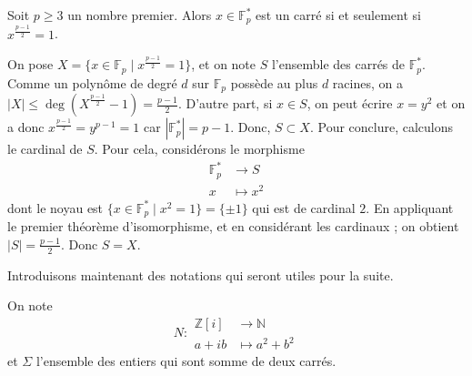 





	\begin{lemma}
		\label{theoreme-des-deux-carres-fermat-1}
		Soit $p \geq 3$ un nombre premier. Alors $x \in \mathbb{F}^*_p$ est un carré si et seulement si $x^{\frac{p-1}{2}} = 1$.
	\end{lemma}

	\begin{demonstration}
		On pose $X = \{ x \in \mathbb{F}_p \mid x^{\frac{p-1}{2}} = 1 \}$, et on note $S$ l'ensemble des carrés de $\mathbb{F}_p^*$. Comme un polynôme de degré $d$ sur $\mathbb{F}_p$ possède au plus $d$ racines, on a $|X| \leq \deg \left( X^{\frac{p-1}{2}} - 1 \right) = \frac{p-1}{2}$.
		\newpar
		D'autre part, si $x \in S$, on peut écrire $x = y^2$ et on a donc $x^{\frac{p-1}{2}} = y^{p-1} = 1$ car $|\mathbb{F}_p^*| = p-1$. Donc, $S \subset X$.
		\newpar
		Pour conclure, calculons le cardinal de $S$. Pour cela, considérons le morphisme
		\[
		\begin{array}{cl}
			\mathbb{F}_p^* &\rightarrow S \\
			x &\mapsto x^2
		\end{array}
		\]
		dont le noyau est $\{ x \in \mathbb{F}_p^* \mid x^2 = 1 \} = \{ \pm 1 \}$ qui est de cardinal $2$. En appliquant le premier théorème d'isomorphisme, et en considérant les cardinaux ; on obtient $|S| = \frac{p-1}{2}$. Donc $S = X$.
	\end{demonstration}

	Introduisons maintenant des notations qui seront utiles pour la suite.

	\begin{notation}
		On note \[ N :
		\begin{array}{cl}
			\mathbb{Z}[i] &\rightarrow \mathbb{N} \\
			a+ib &\mapsto a^2 + b^2
		\end{array}
		\] et $\Sigma$ l'ensemble des entiers qui sont somme de deux carrés.
	\end{notation}

